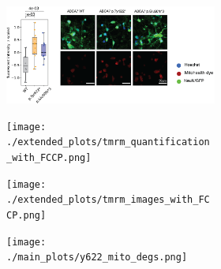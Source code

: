 \begin{figure}[ht]
\begin{subfigure}[t]{.7\textwidth}
\begin{subfigure}[t]{.2\textwidth}
        \end{subfigure}     
        \begin{subfigure}[t]{.7\textwidth}
            \caption{}
            \includegraphics[width=\textwidth]{./extended_plots/mitohealth_dye.png}        
        \end{subfigure}     
        \par
        \begin{subfigure}[t]{.2\textwidth}
            \caption{}
            \texttt{[image: ./extended\_plots/tmrm\_quantification\_with\_FCCP.png]}        
        \end{subfigure}     
        \begin{subfigure}[t]{.5\textwidth}
            \caption{}
            \texttt{[image: ./extended\_plots/tmrm\_images\_with\_FCCP.png]}        
        \end{subfigure}     
        \begin{subfigure}[t]{.3\textwidth}
            \caption{}
            \texttt{[image: ./main\_plots/y622\_mito\_degs.png]}        
        \end{subfigure}    
    \end{subfigure}     

\end{figure}
